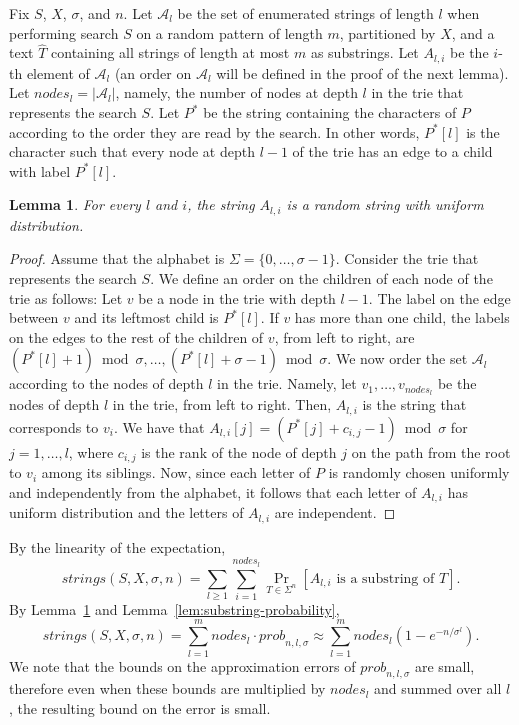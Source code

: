 \documentclass[12pt]{article}
\newtheorem{lemma}[theorem]{Lemma}
\newcommand{\partition}{X}
\newcommand{\numstrings}{\mathit{strings}}
\newcommand{\strings}{\mathcal{A}}
\newcommand{\numnodes}[1]{\mathit{nodes}_{#1}}
\newcommand{\prob}[2]{\mathit{prob}_{#1,#2,\sigma}}
\newcommand{\Psearch}{P^*}
\begin{document}
Fix $S$, $\partition$, $\sigma$, and $n$.
Let $\strings_l$ be the set of enumerated strings of length $l$
when performing search $S$ on a random pattern of length $m$,
partitioned by $\partition$,
and a text $\hat{T}$ containing all strings of length at most $m$ as
substrings.
Let $A_{l,i}$ be the $i$-th element of $\strings_l$
(an order on $\strings_l$ will be defined in the proof of the next lemma).
Let $\numnodes{l} = |\strings_l|$, namely, the number of nodes
at depth $l$ in the trie that represents the search $S$.
Let $\Psearch$ be the string containing the characters of $P$ according to the
order they are read by the search.
In other words, $\Psearch[l]$ is the character such that 
every node at depth $l-1$ of the trie has an edge to a child
with label $\Psearch[l]$.

\begin{lemma}\label{lem:Ali}
For every $l$ and $i$, the string $A_{l,i}$ is a random string with uniform
distribution.
\end{lemma}
\begin{proof}
Assume that the alphabet is $\Sigma=\{0,\ldots,\sigma-1\}$.
Consider the trie that represents the search $S$.
We define an order on the children of each node of the trie as follows:
Let $v$ be a node in the trie with depth $l-1$.
The label on the edge between $v$ and its leftmost child is 
$\Psearch[l]$.
If $v$ has more than one child, the labels on the edges to the rest of the
children of $v$, from left to right,
are $(\Psearch[l]+1)\bmod \sigma,\ldots,(\Psearch[l]+\sigma-1)\bmod \sigma$.
We now order the set $\strings_l$ according to the nodes of depth
$l$ in the trie. Namely, let $v_1,\ldots,v_{\numnodes{l}}$
be the nodes of depth $l$ in the trie, from left to right.
Then, $A_{l,i}$ is the string that corresponds to $v_i$.
We have that $A_{l,i}[j]=(\Psearch[j]+c_{i,j}-1)\bmod \sigma$ for
$j = 1,\ldots,l$,
where $c_{i,j}$ is the rank of the node of depth $j$ on the path from the
root to $v_i$ among its siblings.
Now, since each letter of $P$ is randomly chosen uniformly and independently
from the alphabet, it follows that each letter of $A_{l,i}$ has uniform
distribution and the letters of $A_{l,i}$ are independent.
\end{proof}

By the linearity of the expectation,
\[ \numstrings(S,\partition,\sigma,n) =
 \sum_{l \geq 1} \sum_{i=1}^{\numnodes{l}}
 \Pr_{T\in \Sigma^n}[\text{$A_{l,i}$ is a substring of $T$}].
\]
By Lemma~\ref{lem:Ali} and Lemma~\ref{lem:substring-probability},
\begin{equation}\label{eq:a}
\numstrings(S,\partition,\sigma,n) = 
 \sum_{l=1}^{m} \numnodes{l} \cdot \prob{n}{l} \approx
 \sum_{l = 1}^{m} \numnodes{l} (1-e^{-n/\sigma^{l}}).
\end{equation}
We note that the bounds on the approximation errors of $\prob{n}{l}$
are small, therefore even when these bounds are multiplied by $\numnodes{l}$
and summed over all $l$, the resulting bound on the error is small.
\end{document}
